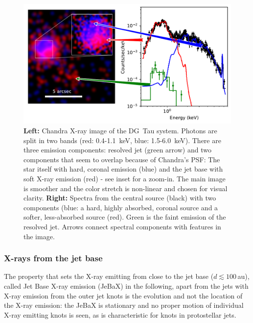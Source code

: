 \begin{figure}[t]

\includegraphics[width=\textwidth]{figs/DGTau.pdf}
\caption{{\bf Left: } Chandra X-ray image of the DG~Tau system. Photons are split in two bands (red: 0.4-1.1~keV, blue: 1.5-6.0~keV). There are three emission components: resolved jet (green arrow) and two components that seem to overlap because of Chandra's PSF: The star itself with hard, coronal emission (blue) and the jet base with soft X-ray emission (red) - see inset for a zoom-in. The main image is smoother and the color stretch is non-linear and chosen for visual clarity.
         {\bf Right: } Spectra from the central source (black) with two components (blue: a hard, highly absorbed, coronal source and a softer, less-absorbed source (red). Green is the faint emission of the resolved jet. Arrows connect spectral components with features in the image. \label{fig:dg_tau_X}}
\end{figure}

\subsubsection{X-rays from the jet base}
The property that sets the X-ray emitting from close to the jet base  ($d\lesssim100\,$au), called Jet Base X-ray emission (JeBaX) in the following, apart from the jets with X-ray emission from the outer jet knots is the  evolution  and not the location of the X-ray emission:
the JeBaX is stationary and no proper motion of individual X-ray emitting knots is seen, as is characteristic for knots in protostellar jets.



